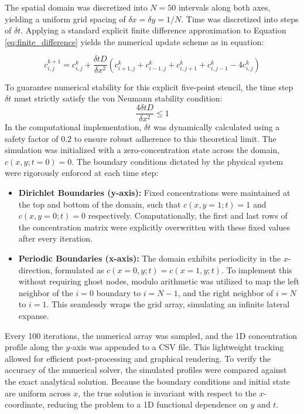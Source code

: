 \documentclass[10pt, journal]{IEEEtran}
\begin{document}
The spatial domain was discretized into $N = 50$ intervals along both axes, yielding a uniform grid spacing of $\delta x = \delta y = 1/N$. Time was discretized into steps of $\delta t$. Applying a standard explicit finite difference approximation to Equation \ref{eq:finite_difference} yields the numerical update scheme as in equation:

    \begin{equation}
        c_{i,j}^{k+1}=c_{i,j}^{k}+\frac{\delta t D}{\delta x^{2}}(c_{i+1,j}^{k}+c_{i-1,j}^{k}+c_{i,j+1}^{k}+c_{i,j-1}^{k}-4c_{i,j}^{k})
    \end{equation}

To guarantee numerical stability for this explicit five-point stencil, the time step $\delta t$ must strictly satisfy the von Neumann stability condition:
\begin{equation}
    \frac{4\delta t D}{\delta x^{2}} \le 1
    \label{eq:stability}
\end{equation}
In the computational implementation, $\delta t$ was dynamically calculated using a safety factor of $0.2$ to ensure robust adherence to this theoretical limit. The simulation was initialized with a zero-concentration state across the domain, $c(x,y; t=0) = 0$. The boundary conditions dictated by the physical system were rigorously enforced at each time step:
\begin{itemize}
    \item \textbf{Dirichlet Boundaries (y-axis):} Fixed concentrations were maintained at the top and bottom of the domain, such that $c(x,y=1;t)=1$ and $c(x,y=0;t)=0$ respectively. Computationally, the first and last rows of the concentration matrix were explicitly overwritten with these fixed values after every iteration.
    \item \textbf{Periodic Boundaries (x-axis):} The domain exhibits periodicity in the $x$-direction, formulated as $c(x=0,y;t) = c(x=1,y;t)$. To implement this without requiring ghost nodes, modulo arithmetic was utilized to map the left neighbor of the $i=0$ boundary to $i=N-1$, and the right neighbor of $i=N$ to $i=1$. This seamlessly wraps the grid array, simulating an infinite lateral expanse.
\end{itemize}

Every 100 iterations, the numerical array was sampled, and the 1D concentration profile along the $y$-axis was appended to a CSV file. This lightweight tracking allowed for efficient post-processing and graphical rendering. To verify the accuracy of the numerical solver, the simulated profiles were compared against the exact analytical solution. Because the boundary conditions and initial state are uniform across $x$, the true solution is invariant with respect to the $x$-coordinate, reducing the problem to a 1D functional dependence on $y$ and $t$.
\end{document}
